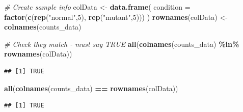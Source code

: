 \documentclass[
]{article}
\newenvironment{Shaded}{\begin{snugshade}}{\end{snugshade}}
\newcommand{\AttributeTok}[1]{\textcolor[rgb]{0.13,0.29,0.53}{#1}}
\newcommand{\CommentTok}[1]{\textcolor[rgb]{0.56,0.35,0.01}{\textit{#1}}}
\newcommand{\DecValTok}[1]{\textcolor[rgb]{0.00,0.00,0.81}{#1}}
\newcommand{\FunctionTok}[1]{\textcolor[rgb]{0.13,0.29,0.53}{\textbf{#1}}}
\newcommand{\NormalTok}[1]{#1}
\newcommand{\OtherTok}[1]{\textcolor[rgb]{0.56,0.35,0.01}{#1}}
\newcommand{\SpecialCharTok}[1]{\textcolor[rgb]{0.81,0.36,0.00}{\textbf{#1}}}
\newcommand{\StringTok}[1]{\textcolor[rgb]{0.31,0.60,0.02}{#1}}
\begin{document}
\begin{Shaded}
\begin{Highlighting}[]
\CommentTok{\# Create sample info}
\NormalTok{colData }\OtherTok{\textless{}{-}} \FunctionTok{data.frame}\NormalTok{(}
  \AttributeTok{condition =} \FunctionTok{factor}\NormalTok{(}\FunctionTok{c}\NormalTok{(}\FunctionTok{rep}\NormalTok{(}\StringTok{"normal"}\NormalTok{,}\DecValTok{5}\NormalTok{), }\FunctionTok{rep}\NormalTok{(}\StringTok{"mutant"}\NormalTok{,}\DecValTok{5}\NormalTok{)))}
\NormalTok{)}
\FunctionTok{rownames}\NormalTok{(colData) }\OtherTok{\textless{}{-}} \FunctionTok{colnames}\NormalTok{(counts\_data)}

\CommentTok{\# Check they match {-} must say TRUE}
\FunctionTok{all}\NormalTok{(}\FunctionTok{colnames}\NormalTok{(counts\_data) }\SpecialCharTok{\%in\%} \FunctionTok{rownames}\NormalTok{(colData))}
\end{Highlighting}
\end{Shaded}

\begin{verbatim}
## [1] TRUE
\end{verbatim}

\begin{Shaded}
\begin{Highlighting}[]
\FunctionTok{all}\NormalTok{(}\FunctionTok{colnames}\NormalTok{(counts\_data) }\SpecialCharTok{==} \FunctionTok{rownames}\NormalTok{(colData))}
\end{Highlighting}
\end{Shaded}

\begin{verbatim}
## [1] TRUE
\end{verbatim}

\begin{Shaded}
\end{Shaded}
\end{document}
